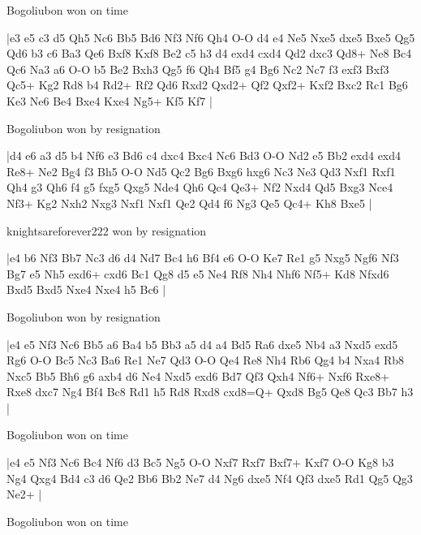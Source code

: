 \showboard

Bogoliubon won on time

\makegametitle
|e3 e5 c3 d5 Qh5 Nc6 Bb5 Bd6 Nf3 Nf6 Qh4 O-O d4 e4 Ne5 Nxe5 dxe5 Bxe5 Qg5 Qd6 b3 c6 Ba3 Qe6 Bxf8 Kxf8 Be2 c5 h3 d4 exd4 cxd4 Qd2 dxc3 Qd8+ Ne8 Bc4 Qc6 Na3 a6 O-O b5 Be2 Bxh3 Qg5 f6 Qh4 Bf5 g4 Bg6 Nc2 Nc7 f3 exf3 Bxf3 Qc5+ Kg2 Rd8 b4 Rd2+ Rf2 Qd6 Rxd2 Qxd2+ Qf2 Qxf2+ Kxf2 Bxc2 Rc1 Bg6 Ke3 Ne6 Be4 Bxe4 Kxe4 Ng5+ Kf5 Kf7  |

\showboard

Bogoliubon won by resignation

\makegametitle
|d4 e6 a3 d5 b4 Nf6 e3 Bd6 c4 dxc4 Bxc4 Nc6 Bd3 O-O Nd2 e5 Bb2 exd4 exd4 Re8+ Ne2 Bg4 f3 Bh5 O-O Nd5 Qc2 Bg6 Bxg6 hxg6 Nc3 Ne3 Qd3 Nxf1 Rxf1 Qh4 g3 Qh6 f4 g5 fxg5 Qxg5 Nde4 Qh6 Qc4 Qe3+ Nf2 Nxd4 Qd5 Bxg3 Nce4 Nf3+ Kg2 Nxh2 Nxg3 Nxf1 Nxf1 Qe2 Qd4 f6 Ng3 Qe5 Qc4+ Kh8 Bxe5  |

\showboard

knightsareforever222 won by resignation

\makegametitle
|e4 b6 Nf3 Bb7 Nc3 d6 d4 Nd7 Bc4 h6 Bf4 e6 O-O Ke7 Re1 g5 Nxg5 Ngf6 Nf3 Bg7 e5 Nh5 exd6+ cxd6 Bc1 Qg8 d5 e5 Ne4 Rf8 Nh4 Nhf6 Nf5+ Kd8 Nfxd6 Bxd5 Bxd5 Nxe4 Nxe4 h5 Bc6  |

\showboard

Bogoliubon won by resignation

\makegametitle
|e4 e5 Nf3 Nc6 Bb5 a6 Ba4 b5 Bb3 a5 d4 a4 Bd5 Ra6 dxe5 Nb4 a3 Nxd5 exd5 Rg6 O-O Bc5 Nc3 Ba6 Re1 Ne7 Qd3 O-O Qe4 Re8 Nh4 Rb6 Qg4 b4 Nxa4 Rb8 Nxc5 Bb5 Bh6 g6 axb4 d6 Ne4 Nxd5 exd6 Bd7 Qf3 Qxh4 Nf6+ Nxf6 Rxe8+ Rxe8 dxc7 Ng4 Bf4 Bc8 Rd1 h5 Rd8 Rxd8 cxd8=Q+ Qxd8 Bg5 Qe8 Qc3 Bb7 h3  |

\showboard

Bogoliubon won on time

\makegametitle
|e4 e5 Nf3 Nc6 Bc4 Nf6 d3 Bc5 Ng5 O-O Nxf7 Rxf7 Bxf7+ Kxf7 O-O Kg8 b3 Ng4 Qxg4 Bd4 c3 d6 Qe2 Bb6 Bb2 Ne7 d4 Ng6 dxe5 Nf4 Qf3 dxe5 Rd1 Qg5 Qg3 Ne2+  |

\showboard

Bogoliubon won on time

